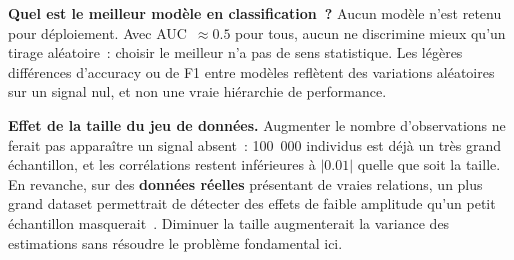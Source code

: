 \textbf{Quel est le meilleur modèle en classification~?} Aucun modèle n'est retenu pour déploiement. Avec AUC~$\approx 0.5$ pour tous, aucun ne discrimine mieux qu'un tirage aléatoire~: choisir le \og meilleur \fg{} n'a pas de sens statistique. Les légères différences d'accuracy ou de F1 entre modèles reflètent des variations aléatoires sur un signal nul, et non une vraie hiérarchie de performance.

\textbf{Effet de la taille du jeu de données.} Augmenter le nombre d'observations ne ferait pas apparaître un signal absent~: 100~000 individus est déjà un très grand échantillon, et les corrélations restent inférieures à $|0.01|$ quelle que soit la taille. En revanche, sur des \textbf{données réelles} présentant de vraies relations, un plus grand dataset permettrait de détecter des effets de faible amplitude qu'un petit échantillon masquerait~\cite{james2021}. Diminuer la taille augmenterait la variance des estimations sans résoudre le problème fondamental ici.
